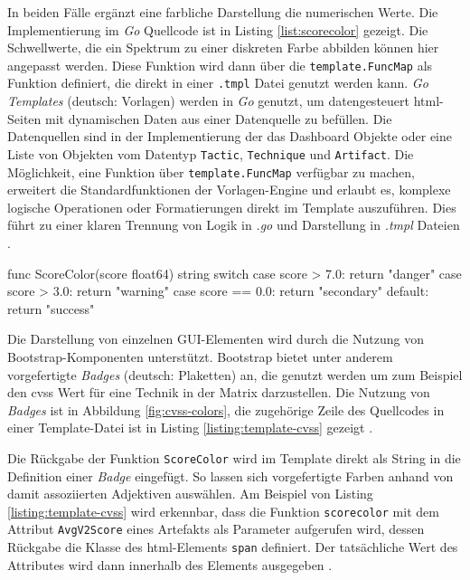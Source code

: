 \par In beiden Fälle ergänzt eine farbliche Darstellung die numerischen Werte. Die Implementierung im \textit{Go} Quellcode ist in Listing \ref{list:scorecolor} gezeigt. Die Schwellwerte, die ein Spektrum zu einer diskreten Farbe abbilden können hier angepasst werden. Diese Funktion wird dann über die \verb|template.FuncMap| als Funktion definiert, die direkt in einer \verb|.tmpl| Datei genutzt werden kann. \textit{Go Templates} (deutsch: Vorlagen) werden in \textit{Go} genutzt, um datengesteuert \gls{html}-Seiten mit dynamischen Daten aus einer Datenquelle zu befüllen. Die Datenquellen sind in der Implementierung der das Dashboard Objekte oder eine Liste von Objekten vom Datentyp \verb|Tactic|, \verb|Technique| und \verb|Artifact|. Die Möglichkeit, eine Funktion über \verb|template.FuncMap| verfügbar zu machen, erweitert die Standardfunktionen der Vorlagen-Engine und erlaubt es, komplexe logische Operationen oder Formatierungen direkt im Template auszuführen. Dies führt zu einer klaren Trennung von Logik in \textit{.go} und Darstellung in \textit{.tmpl} Dateien \autocite{TemplatePackageText}.

\begin{code}[caption={Implementierung der farblichen Kategorisierung von Schweregraden}]
    func ScoreColor(score float64) string {
        switch {
            case score > 7.0:
            return "danger"
            case score > 3.0:
            return "warning"
            case score == 0.0:
            return "secondary"
            default:
            return "success"
        }
    }
\end{code}
\label{list:scorecolor}
Die Darstellung von einzelnen GUI-Elementen wird durch die Nutzung von Bootstrap-Komponenten unterstützt. Bootstrap bietet unter anderem vorgefertigte \textit{Badges} (deutsch: Plaketten) an, die genutzt werden um zum Beispiel den \gls{cvss} Wert für eine Technik in der Matrix darzustellen. Die Nutzung von \textit{Badges} ist in Abbildung \ref{fig:cvss-colors}, die zugehörige Zeile des Quellcodes in einer Template-Datei ist in Listing \ref{listing:template-cvss} gezeigt \autocite{contributorsmarkottojacobthorntonandbootstrapBadges}.

Die Rückgabe der Funktion \verb|ScoreColor| wird im Template direkt als String in die Definition einer \textit{Badge} eingefügt. So lassen sich vorgefertigte Farben anhand von damit assoziierten Adjektiven auswählen. Am Beispiel von Listing \ref{listing:template-cvss} wird erkennbar, dass die Funktion \verb|scorecolor| mit dem Attribut \verb|AvgV2Score| eines Artefakts als Parameter aufgerufen wird, dessen Rückgabe die Klasse des \gls{html}-Elements \verb|span| definiert. Der tatsächliche Wert des Attributes wird dann innerhalb des Elements ausgegeben \autocite{HTMLSpanTag}.

